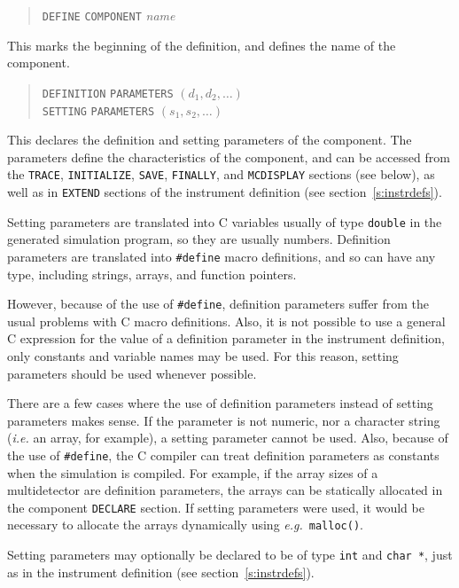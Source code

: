 \begin{quote}
  \texttt{DEFINE} \texttt{COMPONENT} \textit{name}
\end{quote}
This marks the beginning of the definition, and defines the name of the
component.
\begin{quote}
  \texttt{DEFINITION} \texttt{PARAMETERS} $(d_1, d_2, \ldots)$ \\
  \texttt{SETTING} \texttt{PARAMETERS} $(s_1, s_2, \ldots)$
\end{quote}
This declares the definition and setting parameters of the component.
The parameters define the characteristics of the component, and can be
accessed from the \verb+TRACE+, \verb+INITIALIZE+, \verb+SAVE+, \verb+FINALLY+, and \verb+MCDISPLAY+ sections (see below),
as well as in \verb+EXTEND+ sections of the instrument definition (see section~\ref{s:instrdefs}).

Setting parameters are translated into C variables usually of type
\verb+double+ in the generated simulation program, so they are usually
numbers. Definition parameters are translated into \verb+#define+ macro
definitions, and so can have any type, including strings, arrays, and
function pointers.

However, because of the use of \verb+#define+, definition parameters
suffer from the usual problems with C macro definitions. Also, it is not
possible to use a general C expression for the value of a definition
parameter in the instrument definition, only constants and variable
names may be used. For this reason, setting parameters should be used
whenever possible.

There are a few cases where the use of definition parameters instead of
setting parameters makes sense. If the parameter is not numeric, nor a character string ({\em i.e.} an
array, for example), a setting parameter cannot be
used. Also, because of the use of \verb+#define+, the C compiler can
treat definition parameters as constants when the simulation is
compiled. For example, if the array sizes of a multidetector are
definition parameters, the arrays can be statically allocated in the
component \verb+DECLARE+ section. If setting parameters were used, it
would be necessary to allocate the arrays dynamically using {\em e.g.}\
\verb+malloc()+.

Setting parameters may optionally be declared to be of type \verb+int+ and \verb+char *+, just as in the instrument definition (see section~\ref{s:instrdefs}).

